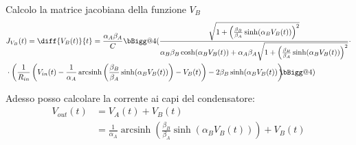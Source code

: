 \documentclass[12pt,a4paper,twoside,english,italian]{book}
\makeatletter
\DeclareMathOperator{\arcsinh}{arcsinh}
\newcommand{\reallybig}{\bBigg@{4}}
\makeatother
\begin{document}
		Calcolo la matrice jacobiana della funzione $V_{B}$
		\begin{equation}
			\label{eq:jacobiana}
			\begin{split}
				&J_{V_{B}}(t) = \diff{V_{B}(t)}{t} = \frac{\alpha_{A}\beta_{A}}{C}\reallybig(\frac{\sqrt{1+\left(\frac{\beta_{B}}{\beta_{A}}\sinh(\alpha_{B}V_{B}(t))\right)^{2}}}{\alpha_{B}\beta_{B}\cosh(\alpha_{B}V_{B}(t))+\alpha_{A}\beta_{A}\sqrt{1+\left(\frac{\beta_{B}}{\beta_{A}}\sinh(\alpha_{B}V_{B}(t))\right)^{2}}}\cdot\\&\cdot\left(\frac{1}{R_{in}}\left(V_{in}(t)-\frac{1}{\alpha_{A}} \arcsinh \left(\frac{\beta_{B}}{\beta_{A}} \sinh(\alpha_{B}V_{B}(t))\right)-V_{B}(t)\right)-2\beta_{B}\sinh(\alpha_{B}V_{B}(t))\right)\hspace{-7px}\reallybig)
			\end{split}
		\end{equation}
		
		Adesso posso calcolare la corrente ai capi del condensatore:
		\begin{equation}
			\label{eq:punto_fisso2}
			\begin{split}
				V_{out}(t) &= V_{A}(t)+V_{B}(t)\\
				&= \frac{1}{\alpha_{A}} \arcsinh \left(\frac{\beta_{B}}{\beta_{A}} \sinh(\alpha_{B}V_{B}(t))\right)+V_{B}(t)
			\end{split}
		\end{equation}
	\pagebreak
	
	\backmatter
	
	\printbibliography
\end{document}
